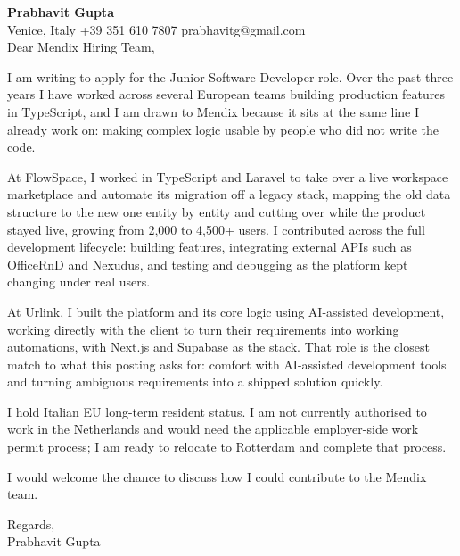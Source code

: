 \documentclass[a4paper,10.5pt]{article}
\begin{document}
\textbf{Prabhavit Gupta}\\
Venice, Italy \textbar{} +39 351 610 7807 \textbar{} prabhavitg@gmail.com\\[10pt]
Dear Mendix Hiring Team,

I am writing to apply for the Junior Software Developer role. Over the past three years I have worked across several European teams building production features in TypeScript, and I am drawn to Mendix because it sits at the same line I already work on: making complex logic usable by people who did not write the code.

At FlowSpace, I worked in TypeScript and Laravel to take over a live workspace marketplace and automate its migration off a legacy stack, mapping the old data structure to the new one entity by entity and cutting over while the product stayed live, growing from 2,000 to 4,500+ users. I contributed across the full development lifecycle: building features, integrating external APIs such as OfficeRnD and Nexudus, and testing and debugging as the platform kept changing under real users.

At Urlink, I built the platform and its core logic using AI-assisted development, working directly with the client to turn their requirements into working automations, with Next.js and Supabase as the stack. That role is the closest match to what this posting asks for: comfort with AI-assisted development tools and turning ambiguous requirements into a shipped solution quickly.

I hold Italian EU long-term resident status. I am not currently authorised to work in the Netherlands and would need the applicable employer-side work permit process; I am ready to relocate to Rotterdam and complete that process.

I would welcome the chance to discuss how I could contribute to the Mendix team.

Regards,\\
Prabhavit Gupta
\end{document}
